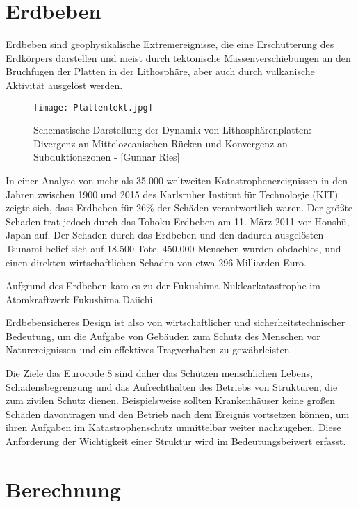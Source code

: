 \section{Erdbeben}
\label{sec:erdbeben}

Erdbeben sind geophysikalische Extremereignisse, die eine Erschütterung des Erdkörpers darstellen und meist durch tektonische Massenverschiebungen an den Bruchfugen der Platten in der Lithosphäre, aber auch durch vulkanische Aktivität ausgelöst werden. \cite{ETHZ}

\begin{figure}[ht]
    \centering
    \texttt{[image: Plattentekt.jpg]}
    \caption{Schematische Darstellung der Dynamik von Lithosphärenplatten: Divergenz an Mittelozeanischen Rücken und Konvergenz an Subduktionszonen - [Gunnar Ries]}
\end{figure}

In einer Analyse von mehr als 35.000 weltweiten Katastrophenereignissen in den Jahren zwischen 1900 und 2015 des Karlsruher Institut für Technologie (KIT) zeigte sich, dass Erdbeben für 26\% der Schäden verantwortlich waren.
Der größte Schaden trat jedoch durch das Tohoku-Erdbeben am 11. März 2011 vor Honshū, Japan auf. Der Schaden durch das Erdbeben und den dadurch ausgelösten Tsunami belief sich auf 18.500 Tote, 450.000 Menschen wurden obdachlos, und einen direkten wirtschaftlichen Schaden von etwa 296 Milliarden Euro. \cite{DANIELL}

Aufgrund des Erdbeben kam es zu der Fukushima-Nuklearkatastrophe im Atomkraftwerk Fukushima Daiichi.

Erdbebensicheres Design ist also von wirtschaftlicher und sicherheitstechnischer Bedeutung, um die Aufgabe von Gebäuden zum Schutz des Menschen vor Naturereignissen und ein effektives Tragverhalten zu gewährleisten.

Die Ziele das Eurocode 8 sind daher das Schützen menschlichen Lebens, Schadensbegrenzung und das Aufrechthalten des Betriebs von Strukturen, die zum zivilen Schutz dienen. Beispielsweise sollten Krankenhäuser keine großen Schäden davontragen und den Betrieb nach dem Ereignis vortsetzen können, um ihren Aufgaben im Katastrophenschutz unmittelbar weiter nachzugehen.
Diese Anforderung der Wichtigkeit einer Struktur wird im Bedeutungsbeiwert erfasst. \cite{EC8}

\section{Berechnung}
\label{sec:berechnung}

